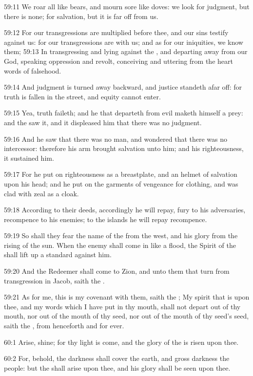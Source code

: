 59:11 We roar all like bears, and mourn sore like doves: we look for
judgment, but there is none; for salvation, but it is far off from us.

59:12 For our transgressions are multiplied before thee, and our sins
testify against us: for our transgressions are with us; and as for our
iniquities, we know them; 59:13 In transgressing and lying against the
\LORD, and departing away from our God, speaking oppression and revolt,
conceiving and uttering from the heart words of falsehood.

59:14 And judgment is turned away backward, and justice standeth afar
off: for truth is fallen in the street, and equity cannot enter.

59:15 Yea, truth faileth; and he that departeth from evil maketh
himself a prey: and the \LORD saw it, and it displeased him that there
was no judgment.

59:16 And he saw that there was no man, and wondered that there was no
intercessor: therefore his arm brought salvation unto him; and his
righteousness, it sustained him.

59:17 For he put on righteousness as a breastplate, and an helmet of
salvation upon his head; and he put on the garments of vengeance for
clothing, and was clad with zeal as a cloak.

59:18 According to their deeds, accordingly he will repay, fury to his
adversaries, recompence to his enemies; to the islands he will repay
recompence.

59:19 So shall they fear the name of the \LORD from the west, and his
glory from the rising of the sun. When the enemy shall come in like a
flood, the Spirit of the \LORD shall lift up a standard against him.

59:20 And the Redeemer shall come to Zion, and unto them that turn
from transgression in Jacob, saith the \LORD.

59:21 As for me, this is my covenant with them, saith the \LORD; My
spirit that is upon thee, and my words which I have put in thy mouth,
shall not depart out of thy mouth, nor out of the mouth of thy seed,
nor out of the mouth of thy seed's seed, saith the \LORD, from
henceforth and for ever.

60:1 Arise, shine; for thy light is come, and the glory of the \LORD is
risen upon thee.

60:2 For, behold, the darkness shall cover the earth, and gross
darkness the people: but the \LORD shall arise upon thee, and his glory
shall be seen upon thee.

